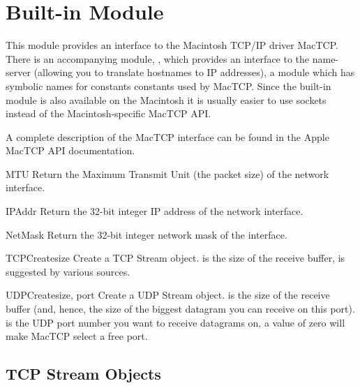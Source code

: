 \section{Built-in Module }




This module provides an interface to the Macintosh TCP/IP driver%
 MacTCP\@. There is an accompanying module,
, which provides an interface to
the name-server (allowing you to translate hostnames to IP addresses),
a module  which has
symbolic names for constants constants used by MacTCP. Since the
built-in module  is also available on the Macintosh it
is usually easier to use sockets instead of the Macintosh-specific
MacTCP API.

A complete description of the MacTCP interface can be found in the
Apple MacTCP API documentation.

\begin{funcdesc}{MTU}{}
Return the Maximum Transmit Unit (the packet size) of the network
interface.
\end{funcdesc}

\begin{funcdesc}{IPAddr}{}
Return the 32-bit integer IP address of the network interface.
\end{funcdesc}

\begin{funcdesc}{NetMask}{}
Return the 32-bit integer network mask of the interface.
\end{funcdesc}

\begin{funcdesc}{TCPCreate}{size}
Create a TCP Stream object.  is the size of the receive
buffer,  is suggested by various sources.
\end{funcdesc}

\begin{funcdesc}{UDPCreate}{size, port}
Create a UDP Stream object.  is the size of the receive
buffer (and, hence, the size of the biggest datagram you can receive
on this port).  is the UDP port number you want to receive
datagrams on, a value of zero will make MacTCP select a free port.
\end{funcdesc}


\subsection{TCP Stream Objects}

